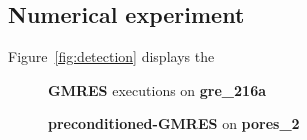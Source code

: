  \subsection{Numerical experiment}
 Figure~\ref{fig:detection} displays the 
 
 

\begin{figure}[h]
	\centering
    
\begin{minipage}[b]{0.45\linewidth}
\centering
\textbf{GMRES} executions on \textbf{gre_216a} 
\end{minipage}
\quad
\begin{minipage}{0.45\linewidth}
\centering
\textbf{preconditioned-GMRES} on \textbf{pores_2}
\end{minipage}\\



\end{figure}
